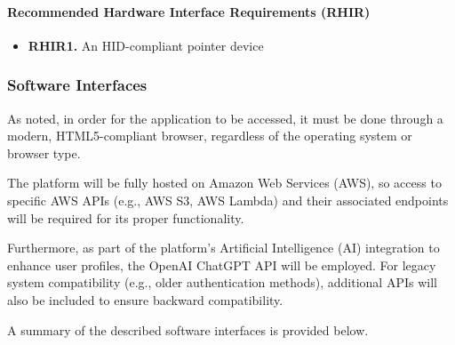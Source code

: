 \paragraph{Recommended Hardware Interface Requirements (RHIR)}
\begin{itemize}
    \item \textbf{RHIR1.} An HID-compliant pointer device
\end{itemize}



\subsubsection{Software Interfaces}

As noted, in order for the application to be accessed, it must be done through a modern, HTML5-compliant browser, regardless of the operating system or browser type. 

The platform will be fully hosted on Amazon Web Services (AWS), so access to specific AWS APIs (e.g., AWS S3, AWS Lambda) and their associated endpoints will be required for its proper functionality.

Furthermore, as part of the platform's Artificial Intelligence (AI) integration to enhance user profiles, the OpenAI ChatGPT API will be employed. 
For legacy system compatibility (e.g., older authentication methods), additional APIs will also be included to ensure backward compatibility.


A summary of the described software interfaces is provided below.

